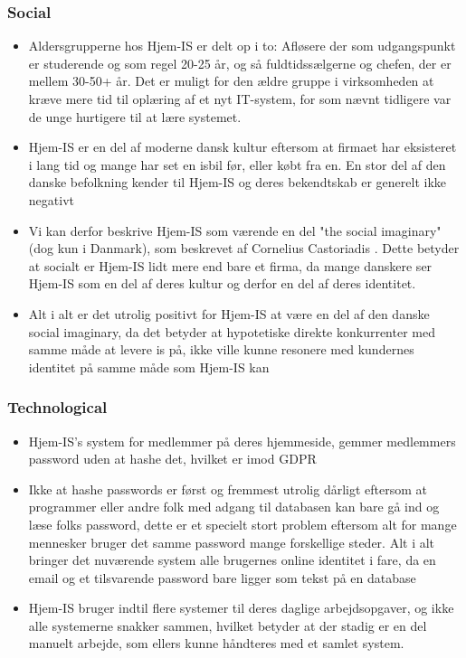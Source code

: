 \subsubsection{Social}
\begin{itemize}
    \item Aldersgrupperne hos Hjem-IS er delt op i to: Afløsere der som udgangspunkt er studerende og som regel 20-25 år, og så fuldtidssælgerne og chefen, der er mellem 30-50+ år. Det er muligt for den ældre gruppe i virksomheden at kræve mere tid til oplæring af et nyt IT-system, for som nævnt tidligere var de unge hurtigere til at lære systemet.
    \item Hjem-IS er en del af moderne dansk kultur eftersom at firmaet har eksisteret i lang tid og mange har set en isbil før, eller købt fra en. En stor del af den danske befolkning kender til Hjem-IS og deres bekendtskab er generelt ikke negativt
    \item Vi kan derfor beskrive Hjem-IS som værende en del "the social imaginary" (dog kun i Danmark), som beskrevet af Cornelius Castoriadis \cite{Castoriadis1997imaginary}. Dette betyder at socialt er Hjem-IS lidt mere end bare et firma, da mange danskere ser Hjem-IS som en del af deres kultur og derfor en del af deres identitet.
    \item Alt i alt er det utrolig positivt for Hjem-IS at være en del af den danske social imaginary, da det betyder at hypotetiske direkte konkurrenter med samme måde at levere is på, ikke ville kunne resonere med kundernes identitet på samme måde som Hjem-IS kan
\end{itemize}
\subsubsection{Technological}
\begin{itemize}
    \item Hjem-IS’s system for medlemmer på deres hjemmeside, gemmer medlemmers password uden at hashe det, hvilket er imod GDPR
    \item Ikke at hashe passwords er først og fremmest utrolig dårligt eftersom at programmer eller andre folk med adgang til databasen kan bare gå ind og læse folks password, dette er et specielt stort problem eftersom alt for mange mennesker bruger det samme password mange forskellige steder. Alt i alt bringer det nuværende system alle brugernes online identitet i fare, da en email og et tilsvarende password bare ligger som tekst på en database
    \item Hjem-IS bruger indtil flere systemer til deres daglige arbejdsopgaver, og ikke alle systemerne snakker sammen, hvilket betyder at der stadig er en del manuelt arbejde, som ellers kunne håndteres med et samlet system.
\end{itemize}
